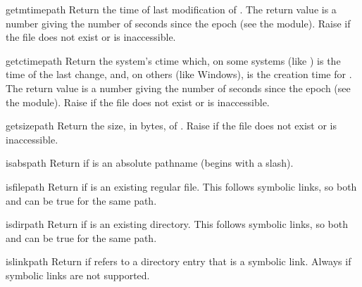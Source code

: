 \begin{funcdesc}{getmtime}{path}
Return the time of last modification of .  The return
value is a number giving the number of seconds since the epoch (see the 
 module).  Raise  if the file does
not exist or is inaccessible.
\end{funcdesc}

\begin{funcdesc}{getctime}{path}
Return the system's ctime which, on some systems (like \UNIX) is the
time of the last change, and, on others (like Windows), is the
creation time for .  The return
value is a number giving the number of seconds since the epoch (see the 
 module).  Raise  if the file does
not exist or is inaccessible.
\end{funcdesc}

\begin{funcdesc}{getsize}{path}
Return the size, in bytes, of .  Raise
 if the file does not exist or is inaccessible.
\end{funcdesc}

\begin{funcdesc}{isabs}{path}
Return  if  is an absolute pathname (begins with a
slash).
\end{funcdesc}

\begin{funcdesc}{isfile}{path}
Return  if  is an existing regular file.  This follows
symbolic links, so both  and 
can be true for the same path.
\end{funcdesc}

\begin{funcdesc}{isdir}{path}
Return  if  is an existing directory.  This follows
symbolic links, so both  and  can
be true for the same path.
\end{funcdesc}

\begin{funcdesc}{islink}{path}
Return  if  refers to a directory entry that is a
symbolic link.  Always  if symbolic links are not supported.
\end{funcdesc}

